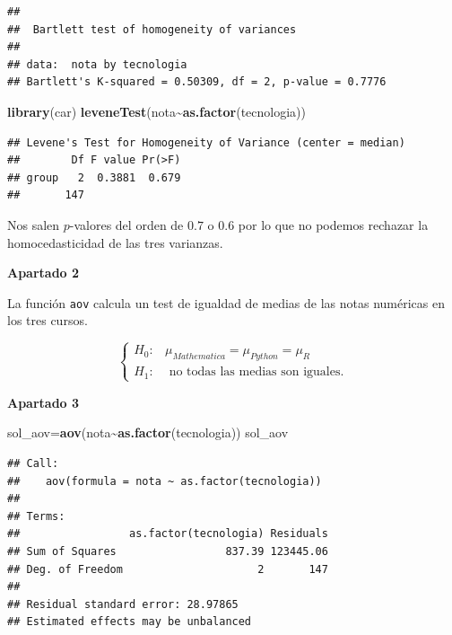 \documentclass[
]{article}
\newenvironment{Shaded}{\begin{snugshade}}{\end{snugshade}}
\newcommand{\KeywordTok}[1]{\textcolor[rgb]{0.13,0.29,0.53}{\textbf{#1}}}
\newcommand{\NormalTok}[1]{#1}
\newcommand{\OperatorTok}[1]{\textcolor[rgb]{0.81,0.36,0.00}{\textbf{#1}}}
\begin{document}
\begin{verbatim}
## 
##  Bartlett test of homogeneity of variances
## 
## data:  nota by tecnologia
## Bartlett's K-squared = 0.50309, df = 2, p-value = 0.7776
\end{verbatim}

\begin{Shaded}
\begin{Highlighting}[]
\KeywordTok{library}\NormalTok{(car)}
\KeywordTok{leveneTest}\NormalTok{(nota}\OperatorTok{\textasciitilde{}}\KeywordTok{as.factor}\NormalTok{(tecnologia))}
\end{Highlighting}
\end{Shaded}

\begin{verbatim}
## Levene's Test for Homogeneity of Variance (center = median)
##        Df F value Pr(>F)
## group   2  0.3881  0.679
##       147
\end{verbatim}

Nos salen \(p\)-valores del orden de \(0.7\) o \(0.6\) por lo que no
podemos rechazar la homocedasticidad de las tres varianzas.

\textbf{Apartado 2}

La función \texttt{aov} calcula un test de igualdad de medias de las
notas numéricas en los tres cursos.

\[
\left\{
\begin{array}{ll}
H_0: &  \mu_{Mathematica}=\mu_{Python}=\mu_{R}\\
H_1: & \mbox{ no  todas las medias son iguales}.
\end{array}
\right.
\]

\textbf{Apartado 3}

\begin{Shaded}
\begin{Highlighting}[]
\NormalTok{sol\_aov=}\KeywordTok{aov}\NormalTok{(nota}\OperatorTok{\textasciitilde{}}\KeywordTok{as.factor}\NormalTok{(tecnologia))}
\NormalTok{sol\_aov}
\end{Highlighting}
\end{Shaded}

\begin{verbatim}
## Call:
##    aov(formula = nota ~ as.factor(tecnologia))
## 
## Terms:
##                 as.factor(tecnologia) Residuals
## Sum of Squares                 837.39 123445.06
## Deg. of Freedom                     2       147
## 
## Residual standard error: 28.97865
## Estimated effects may be unbalanced
\end{verbatim}
\end{document}
